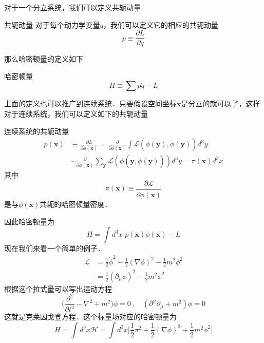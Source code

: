 对于一个分立系统，我们可以定义共轭动量
\begin{definition}{共轭动量}
对于每个动力学变量$q$，我们可以定义它的相应的共轭动量
\begin{equation}
p \equiv \frac{\partial L}{\partial \dot q}
\end{equation}
\end{definition}
那么哈密顿量的定义如下
\begin{definition}{哈密顿量}
\begin{equation}\label{classi_eq1}
H \equiv \sum p \dot q - L
\end{equation}
\end{definition}
上面的定义也可以推广到连续系统．只要假设空间坐标$\mathbf x$是分立的就可以了，这样对于连续系统，我们可以定义如下的共轭动量
\begin{definition}{连续系统的共轭动量}
\begin{equation}
\begin{aligned}
p(\mathbf x) & \equiv \frac{\partial L}{\partial \dot \phi(\mathbf x)} = \frac{\partial}{\partial \dot \phi(\mathbf x)} \int \mathcal L(\phi(\mathbf y),\dot \phi(\mathbf y)) d^3 y \\
& \sim \frac{\partial}{\partial \dot \phi(\mathbf x)} \sum_{\mathbf y} \mathcal L(\phi(\mathbf y,\dot \phi(\mathbf y))) d^3 y=\pi(\mathbf x) d^3 x
\end{aligned}
\end{equation}
其中
\begin{equation}
\pi(\mathbf x) \equiv \frac{\partial \mathcal L}{\partial \dot \phi(\mathbf x)}
\end{equation}
是与$\phi(\mathbf x)$共轭的哈密顿量密度．
\end{definition}
因此哈密顿量为
\begin{equation}
H = \int d^3 x\,\, p(\mathbf x) \dot \phi(\mathbf x) - L
\end{equation}
现在我们来看一个简单的例子．
\begin{align}\nonumber
\mathcal L & = \frac{1}{2} \dot \phi^2 - \frac{1}{2} (\nabla \phi)^2 - \frac{1}{2} m^2 \phi^2 \\
& = \frac{1}{2} (\partial_\mu\phi)^2 - \frac{1}{2} m^2 \phi^2
\end{align}
根据这个拉式量可以写出运动方程
\begin{equation}
\bigg( \frac{\partial^2}{\partial t^2} - \nabla^2 +m^2 \bigg)\phi = 0~,\quad (\partial^\mu\partial_\mu+m^2)\phi = 0
\end{equation}
这就是克莱因戈登方程．这个标量场对应的哈密顿量为
\begin{equation}
H =  \int d^3x \mathcal H = \int d^3 x \bigg[ \frac{1}{2} \pi^2 + \frac{1}{2} (\nabla \phi)^2 + \frac{1}{2} m^2 \phi^2 \bigg] 
\end{equation} 

